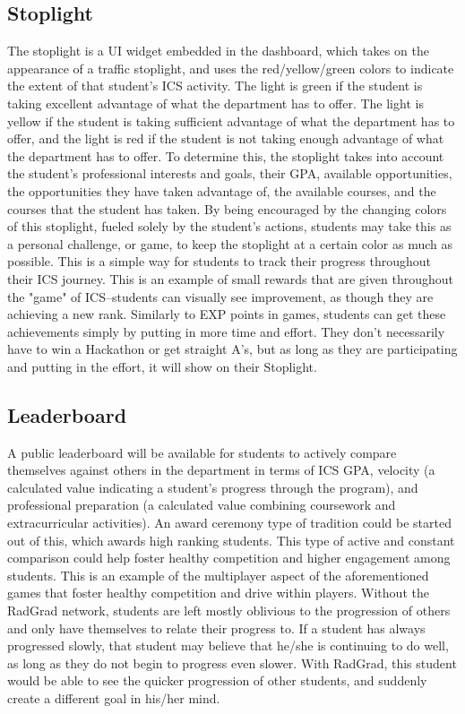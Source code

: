 \subsection{Stoplight}
The stoplight is a UI widget embedded in the dashboard, which takes on the appearance of a traffic stoplight, and uses the red/yellow/green colors to indicate the extent of that student's ICS activity. The light is green if the student is taking excellent advantage of what the department has to offer. The light is yellow if the student is taking sufficient advantage of what the department has to offer, and the light is red if the student is not taking enough advantage of what the department has to offer. To determine this, the stoplight takes into account the student's professional interests and goals, their GPA, available opportunities, the opportunities they have taken advantage of, the available courses, and the courses that the student has taken. By being encouraged by the changing colors of this stoplight, fueled solely by the student's actions, students may take this as a personal challenge, or game, to keep the stoplight at a certain color as much as possible. This is a simple way for students to track their progress throughout their ICS journey. This is an example of small rewards that are given throughout the "game" of ICS--students can visually see improvement, as though they are achieving a new rank. Similarly to EXP points in games, students can get these achievements simply by putting in more time and effort. They don't necessarily have to win a Hackathon or get straight A's, but as long as they are participating and putting in the effort, it will show on their Stoplight. 

\subsection{Leaderboard}
A public leaderboard will be available for students to actively compare themselves against others in the department in terms of ICS GPA, velocity (a calculated value indicating a student's progress through the program), and professional preparation (a calculated value combining coursework and extracurricular activities). An award ceremony type of tradition could be started out of this, which awards high ranking students. This type of active and constant comparison could help foster healthy competition and higher engagement among students. This is an example of the multiplayer aspect of the aforementioned games that foster healthy competition and drive within players. Without the RadGrad network, students are left mostly oblivious to the progression of others and only have themselves to relate their progress to. If a student has always progressed slowly, that student may believe that he/she is continuing to do well, as long as they do not begin to progress even slower. With RadGrad, this student would be able to see the quicker progression of other students, and suddenly create a different goal in his/her mind.
